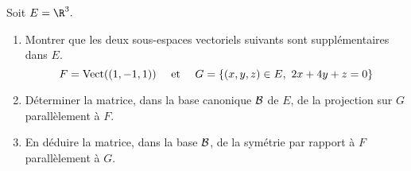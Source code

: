 \documentclass[a4paper,10pt]{report}
\begin{document}
\begin{Exercice}{} Soit $E=\R^3.$

\begin{enumerate}

\item Montrer que les deux sous-espaces vectoriels suivants sont
suppl\'ementaires dans $E.$
$$F=\hbox{Vect}((1,-1,1))\quad\hbox{ et }\quad G=\{(x,y,z)\in
E,\ 2x+4y+z=0\}$$

\item D\'eterminer la matrice, dans la base canonique ${\cal B}$
de $E$, de la projection sur $G$ parallèlement à $F.$

\item En d\'eduire la matrice, dans la base ${\cal B}$, de la
sym\'etrie par rapport \`a $F$ parallèlement à $G.$
\end{enumerate}
\end{Exercice} 

\corr 
\end{document}
